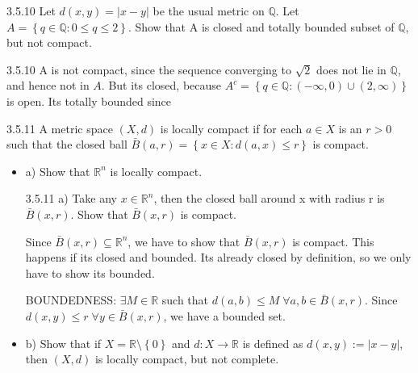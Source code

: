 \documentclass[a4paper,norsk]{article}
\renewcommand{\leq}{\leqslant}
\begin{document}
\begin{oppgavebox}{3.5.10}{}
Let $ d \left( x, y \right) = \left| x - y \right|  $ be the usual metric on $ \mathbb{Q} $. Let $ A = \left\{ q \in \mathbb{Q} : 0 \leq q \leq 2 \right\}  $. Show that A is closed and totally bounded subset of $ \mathbb{Q} $, but not compact.

\begin{proofbox}{3.5.10}{}
  A is not compact, since the sequence converging to $ \sqrt{ 2 } $ does not lie in $ \mathbb{Q} $, and hence not in $ A $. But its closed, because $ A^c = \left\{ q \in \mathbb{Q} : \left( - \infty, 0 \right) \cup \left( 2, \infty \right)   \right\}  $ is open. Its totally bounded since 
\end{proofbox}
\end{oppgavebox}

\begin{oppgavebox}{3.5.11}{}
A metric space $ \left( X, d \right)  $ is locally compact if for each $ a \in X $ is an $ r > 0 $ such that the closed ball $ \bar{B} \left( a, r \right) = \left\{ x \in X : d \left( a, x \right) \leq r \right\}   $ is compact.
\begin{itemize}
  \item a) Show that $ \mathbb{R}^n $ is locally compact.
  \begin{proofbox}{3.5.11 a)}{}
    Take any $ x \in \mathbb{R}^n $, then the closed ball around x with radius r is $ \bar{B} \left( x, r \right)  $. Show that $ \bar{B} \left( x, r \right)  $ is compact. 

    Since $ \bar{B} \left( x, r \right) \subseteq \mathbb{R}^n $, we have to show that $ \bar{B} \left( x, r \right)  $ is compact. This happens if its closed and bounded. Its already closed by definition, so we only have to show its bounded.
    

    BOUNDEDNESS:
    $ \exists M \in \mathbb{R} $ such that $ d \left( a, b \right) \leq M \; \forall a, b \in \bar{B} \left( x, r \right)  $. Since $ d \left( x, y \right) \leq r \; \forall y \in \bar{B} \left( x, r \right)  $, we have a bounded set. 
  \end{proofbox}

  \item b) Show that if $ X = \mathbb{R} \setminus \left\{ 0 \right\}  $ and $ d : X \rightarrow \mathbb{R} $ is defined as $ d \left( x, y \right) := \left| x-y \right|  $, then $ \left( X, d \right)  $ is locally compact, but not complete.
  

\end{itemize}
\end{oppgavebox}
\end{document}
